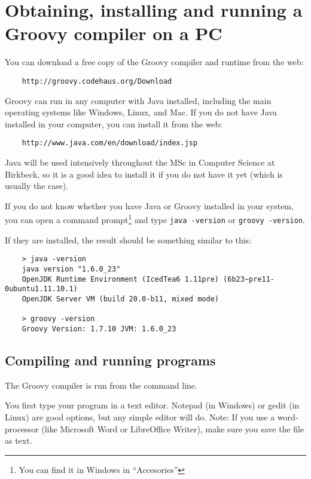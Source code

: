 \section{Obtaining, installing and running a Groovy compiler on a PC}
 
You can download a free copy of the Groovy compiler and runtime from the web:

\begin{verbatim}
    http://groovy.codehaus.org/Download
\end{verbatim}

Groovy can run in any computer with Java installed, including the main
operating systems like Windows, Linux, and Mac. If you do not have
Java installed in your computer, you can install it from the web:

\begin{verbatim}
    http://www.java.com/en/download/index.jsp
\end{verbatim}

Java will be used intensively throughout the MSc in Computer Science
at Birkbeck, so it is a good idea to install it if you do not have it
yet (which is usually the case).

If you do not know whether you have Java or Groovy installed in your
system, you can open a command prompt\footnote{You can find it in Windows in
  ``Accesories''} and type \verb+java -version+ or \verb+groovy -version+. 

If they are installed, the result should be something similar to this:

\begin{verbatim}
    > java -version
    java version "1.6.0_23"
    OpenJDK Runtime Environment (IcedTea6 1.11pre) (6b23~pre11-0ubuntu1.11.10.1)
    OpenJDK Server VM (build 20.0-b11, mixed mode)

    > groovy -version
    Groovy Version: 1.7.10 JVM: 1.6.0_23
\end{verbatim}



\subsection{Compiling and running programs}

The Groovy compiler is run from the command line.

You first type your program in a text editor. Notepad (in Windows) or
gedit (in Linux) are good options, but any simple editor will
do. Note: If you use a word-processor (like Microsoft Word or
LibreOffice Writer), make sure you save the file as text.

